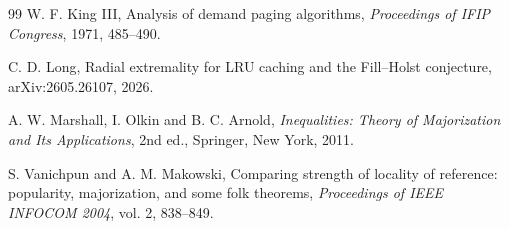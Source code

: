 \documentclass[11pt]{article}
\newcommand{\1}{\mathbf 1}
\begin{document}
\begin{thebibliography}{99}
W. F. King III,
Analysis of demand paging algorithms,
\emph{Proceedings of IFIP Congress}, 1971, 485--490.

C. D. Long,
Radial extremality for LRU caching and the Fill--Holst conjecture,
arXiv:2605.26107, 2026.

A. W. Marshall, I. Olkin and B. C. Arnold,
\emph{Inequalities: Theory of Majorization and Its Applications},
2nd ed., Springer, New York, 2011.

S. Vanichpun and A. M. Makowski,
Comparing strength of locality of reference: popularity, majorization, and some folk theorems,
\emph{Proceedings of IEEE INFOCOM 2004}, vol. 2, 838--849.

\end{thebibliography}
\end{document}
